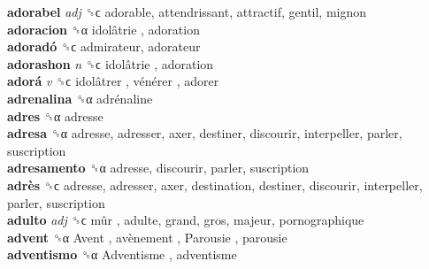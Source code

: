 \textbf{adorabel} \emph{adj}  ␝ϲ  adorable, attendrissant, attractif, gentil, mignon  \\
\textbf{adoracion} ␝α   idolâtrie , adoration  \\
\textbf{adoradó} ␝ϲ  admirateur, adorateur  \\
\textbf{adorashon} \emph{n}  ␝ϲ   idolâtrie , adoration  \\
\textbf{adorá} \emph{v}  ␝ϲ   idolâtrer ,  vénérer , adorer  \\
\textbf{adrenalina} ␝α   adrénaline   \\
\textbf{adres} ␝α  adresse  \\
\textbf{adresa} ␝α  adresse, adresser, axer, destiner, discourir, interpeller, parler, suscription  \\
\textbf{adresamento} ␝α  adresse, discourir, parler, suscription  \\
\textbf{adrès} ␝ϲ  adresse, adresser, axer, destination, destiner, discourir, interpeller, parler, suscription  \\
\textbf{adulto} \emph{adj}  ␝ϲ   mûr , adulte, grand, gros, majeur, pornographique  \\
\textbf{advent} ␝α   Avent ,  avènement ,  Parousie , parousie  \\
\textbf{adventismo} ␝α   Adventisme , adventisme  \\
